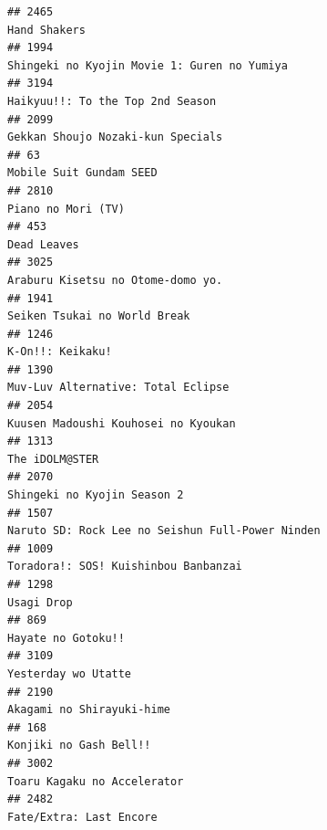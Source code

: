 \documentclass[
]{article}
\begin{document}
\begin{verbatim}
## 2465                                                                                              Hand Shakers
## 1994                                                               Shingeki no Kyojin Movie 1: Guren no Yumiya
## 3194                                                                          Haikyuu!!: To the Top 2nd Season
## 2099                                                                         Gekkan Shoujo Nozaki-kun Specials
## 63                                                                                     Mobile Suit Gundam SEED
## 2810                                                                                        Piano no Mori (TV)
## 453                                                                                                Dead Leaves
## 3025                                                                         Araburu Kisetsu no Otome-domo yo.
## 1941                                                                              Seiken Tsukai no World Break
## 1246                                                                                          K-On!!: Keikaku!
## 1390                                                                        Muv-Luv Alternative: Total Eclipse
## 2054                                                                       Kuusen Madoushi Kouhosei no Kyoukan
## 1313                                                                                            The iDOLM@STER
## 2070                                                                               Shingeki no Kyojin Season 2
## 1507                                                          Naruto SD: Rock Lee no Seishun Full-Power Ninden
## 1009                                                                      Toradora!: SOS! Kuishinbou Banbanzai
## 1298                                                                                                Usagi Drop
## 869                                                                                         Hayate no Gotoku!!
## 3109                                                                                       Yesterday wo Utatte
## 2190                                                                                 Akagami no Shirayuki-hime
## 168                                                                                     Konjiki no Gash Bell!!
## 3002                                                                               Toaru Kagaku no Accelerator
## 2482                                                                                   Fate/Extra: Last Encore

\end{verbatim}
\end{document}
